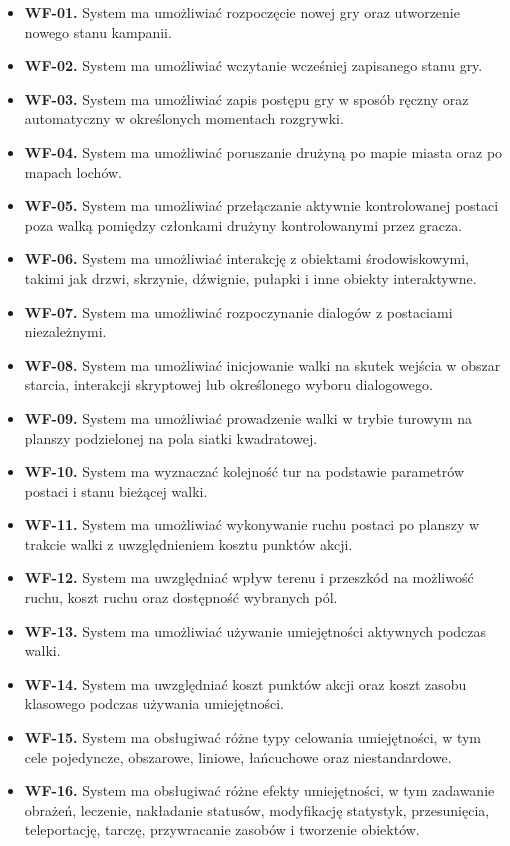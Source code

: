 \begin{itemize}
    \item \textbf{WF-01.} System ma umożliwiać rozpoczęcie nowej gry oraz utworzenie nowego stanu kampanii.
    \item \textbf{WF-02.} System ma umożliwiać wczytanie wcześniej zapisanego stanu gry.
    \item \textbf{WF-03.} System ma umożliwiać zapis postępu gry w sposób ręczny oraz automatyczny w określonych momentach rozgrywki.
    \item \textbf{WF-04.} System ma umożliwiać poruszanie drużyną po mapie miasta oraz po mapach lochów.
    \item \textbf{WF-05.} System ma umożliwiać przełączanie aktywnie kontrolowanej postaci poza walką pomiędzy członkami drużyny kontrolowanymi przez gracza.
    \item \textbf{WF-06.} System ma umożliwiać interakcję z obiektami środowiskowymi, takimi jak drzwi, skrzynie, dźwignie, pułapki i inne obiekty interaktywne.
    \item \textbf{WF-07.} System ma umożliwiać rozpoczynanie dialogów z postaciami niezależnymi.
    \item \textbf{WF-08.} System ma umożliwiać inicjowanie walki na skutek wejścia w obszar starcia, interakcji skryptowej lub określonego wyboru dialogowego.
    \item \textbf{WF-09.} System ma umożliwiać prowadzenie walki w trybie turowym na planszy podzielonej na pola siatki kwadratowej.
    \item \textbf{WF-10.} System ma wyznaczać kolejność tur na podstawie parametrów postaci i stanu bieżącej walki.
    \item \textbf{WF-11.} System ma umożliwiać wykonywanie ruchu postaci po planszy w trakcie walki z uwzględnieniem kosztu punktów akcji.
    \item \textbf{WF-12.} System ma uwzględniać wpływ terenu i przeszkód na możliwość ruchu, koszt ruchu oraz dostępność wybranych pól.
    \item \textbf{WF-13.} System ma umożliwiać używanie umiejętności aktywnych podczas walki.
    \item \textbf{WF-14.} System ma uwzględniać koszt punktów akcji oraz koszt zasobu klasowego podczas używania umiejętności.
    \item \textbf{WF-15.} System ma obsługiwać różne typy celowania umiejętności, w tym cele pojedyncze, obszarowe, liniowe, łańcuchowe oraz niestandardowe.
    \item \textbf{WF-16.} System ma obsługiwać różne efekty umiejętności, w tym zadawanie obrażeń, leczenie, nakładanie statusów, modyfikację statystyk, przesunięcia, teleportację, tarczę, przywracanie zasobów i tworzenie obiektów.

\end{itemize}

